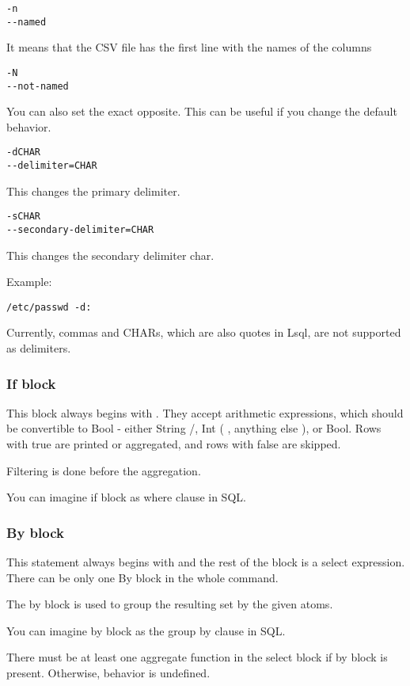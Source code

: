\begin{verbatim}
-n
--named
\end{verbatim}
It means that the CSV file has the first line with the names of the columns

\begin{verbatim}
-N
--not-named
\end{verbatim}
You can also set the exact opposite. This can be useful if you change the default behavior.

\begin{verbatim}
-dCHAR
--delimiter=CHAR
\end{verbatim}
This changes the primary delimiter.

\begin{verbatim}
-sCHAR
--secondary-delimiter=CHAR
\end{verbatim}
This changes the secondary delimiter char.

Example:
\begin{verbatim}
/etc/passwd -d:
\end{verbatim}

Currently, commas and CHARs, which are also quotes in Lsql, are not supported as delimiters.

\subsubsection{If block}
This block always begins with . They accept arithmetic expressions, which should be convertible to Bool - either String /, Int ( , anything else ), or Bool. 
Rows with true are printed or aggregated, and rows with false are skipped.

Filtering is done before the aggregation.

You can imagine if block as where clause in SQL.

\subsubsection{By block}
This statement always begins with  and the rest of the block is a select expression. There can be only one By block in the whole command.

The by block is used to group the resulting set by the given atoms.

You can imagine by block as the group by clause in SQL. 

There must be at least one aggregate function in the select block if by block is present. Otherwise, behavior is undefined.

